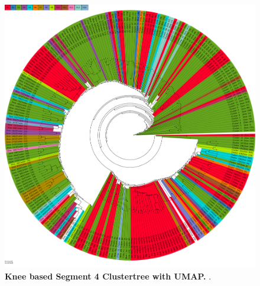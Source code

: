 \begin{figure}[!hbt]
    \includegraphics[width=\dimexpr\textwidth-2\fboxsep-2\fboxrule,fbox]{UMAP/Clustertree_Segment_4_H_Knee.pdf}
    \caption[Knee based Segment 4 Clustertree with \Acrshort{UMAP}]{\textbf{Knee based Segment 4 Clustertree with \Acrshort{UMAP}.} .}
    \label{fig:UMAP_Clusteree_Knee_4}
\end{figure}
